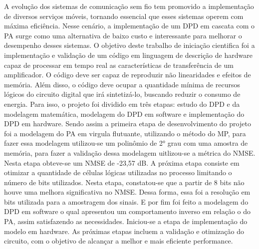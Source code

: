 A evolução dos sistemas de comunicação sem fio tem promovido a implementação de diversos serviços móveis, tornando essencial que esses sistemas operem com máxima eficiência. Nesse cenário, a implementação de um DPD em cascata com o PA surge como uma alternativa de baixo custo e interessante para melhorar o desempenho desses sistemas.
O objetivo deste trabalho de iniciação cientifica foi a implementação e validação de um código em linguagem de descrição de hardware capaz de processar em tempo real as características de transferência de um amplificador. O código deve ser capaz de reproduzir não linearidades e efeitos de memória. Além disso, o código deve ocupar a quantidade mínima de recursos lógicos do circuito digital que irá sintetizá-lo, buscando reduzir o consumo de energia. Para isso, o projeto foi dividido em três etapas: estudo do DPD e da modelagem matemática, modelagem do DPD em software e implementação do DPD em hardware.
Sendo assim a primeira etapa de desenvolvimento do projeto foi a modelagem do PA em virgula flutuante, utilizando o método do MP, para fazer essa modelagem utilizou-se um polinômio de 2° grau com uma amostra de memória, para fazer a validação dessa modelagem uitlizou-se a métrica do NMSE. Nesta etapa obteve-se um NMSE de -23,57 dB. A próxima etapa consiste em otimizar a quantidade de células lógicas utilizadas no processo limitando o número de bits utilizados. Nesta etapa, constatou-se que a partir de 8 bits não houve uma melhora significativa no NMSE. Dessa forma, essa foi a resolução em bits utilizada para a amostragem dos sinais. E por fim foi feito a modelagem do DPD em software o qual apresentou um comportamento inverso em relação o do PA, assim satisfazendo as necessidades. Iniciou-se a etapa de implementação do modelo em hardware. As próximas etapas incluem a validação e otimização do circuito, com o objetivo de alcançar a melhor e mais eficiente performance.